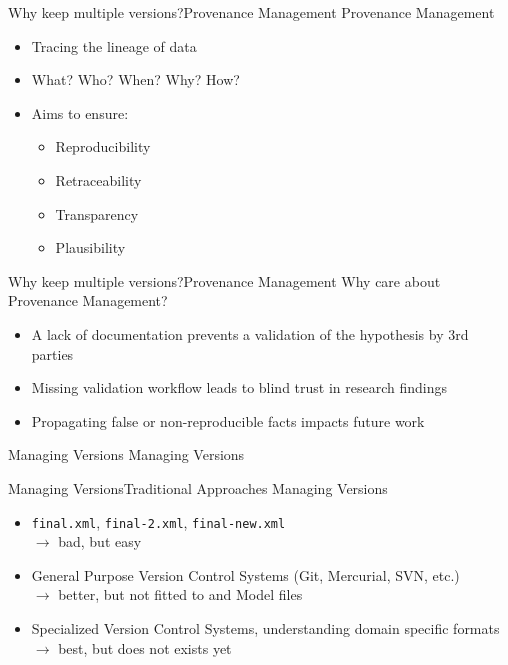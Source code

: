 \begin{frame}{Why keep multiple versions?}{Provenance Management}
	{\Large Provenance Management}
	\\[2.5em]
	\begin{itemize}
		\item Tracing the lineage of data
		\item What? Who? When? Why? How?
		\item Aims to ensure: \nocite{Meyer2015}
		\begin{itemize}
			\item Reproducibility
			\item Retraceability
			\item Transparency
			\item Plausibility
		\end{itemize}
	\end{itemize}
\end{frame}

\begin{frame}{Why keep multiple versions?}{Provenance Management}
	{\Large Why care about Provenance Management?}
	\\[2.5em]
	\begin{itemize}
		\item A lack of documentation prevents a validation of the hypothesis by 3rd parties \nocite{Mesirov2010, Peng2011}
		\item Missing validation workflow leads to blind trust in research findings
		\item Propagating false or non-reproducible facts impacts future work
	\end{itemize}

\end{frame}

\begin{frame}{Managing Versions}{}
	\centering
	\LARGE Managing Versions
\end{frame}

\begin{frame}{Managing Versions}{Traditional Approaches}
	{\Large Managing Versions}
	\\[2.5em]
	\begin{itemize}
		\item \texttt{final.xml}, \texttt{final-2.xml}, \texttt{final-new.xml} \\
			$\rightarrow$ bad, but easy
		
		\item General Purpose Version Control Systems (Git, Mercurial, SVN, etc.) \\
			$\rightarrow$ better, but not fitted to \xml and Model files
			
		\item Specialized Version Control Systems, understanding domain specific formats \\
			$\rightarrow$ best, but does not exists yet
	\end{itemize}
\end{frame}

